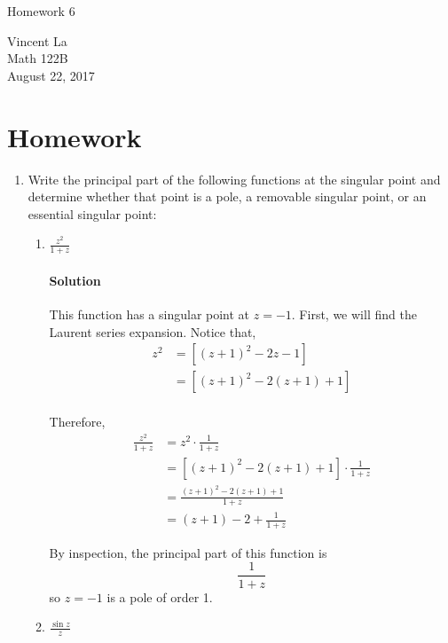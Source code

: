 \documentclass[11pt]{article}
\title{ }
\begin{document}
	\begin{center}	%
		\Large{Homework 6}	%
	\end{center}
	\begin{center}
		Vincent La \\
		Math 122B \\
		August 22, 2017
	\end{center}
	
\section{Homework}
\begin{enumerate}
	\item Write the principal part of the following functions at the singular point and determine whether that point is a pole, a removable singular point, or an essential singular point:
		\begin{enumerate}
			\item $\frac{z^2}{1 + z}$
			\paragraph{Solution}
			
			This function has a singular point at $z = -1$.
			First, we will find the Laurent series expansion. Notice that,
			\[\begin{aligned}
			z^2
			&= [(z + 1)^2 - 2z - 1] \\
			&= [(z + 1)^2 - 2(z + 1) + 1] \\
			\end{aligned}\]
			
			Therefore,
			\[
			\begin{aligned}
			\frac{z^2}{1 + z}
			&= z^2 \cdot \frac{1}{1 + z} \\
			&= [(z + 1)^2 - 2(z + 1) + 1] \cdot \frac{1}{1 + z} \\
			&= \frac{(z + 1)^2 - 2(z + 1) + 1}{1 + z} \\
			&= (z + 1) - 2 + \frac{1}{1 + z}
			\end{aligned} \]
			
			By inspection, the principal part of this function is 
			\[\frac{1}{1 + z}\]
			so $z = -1$ is a pole of order 1.			
			
			\item $\frac{\sin{z}}{z}$

\end{enumerate}
\end{enumerate}
\end{document}
